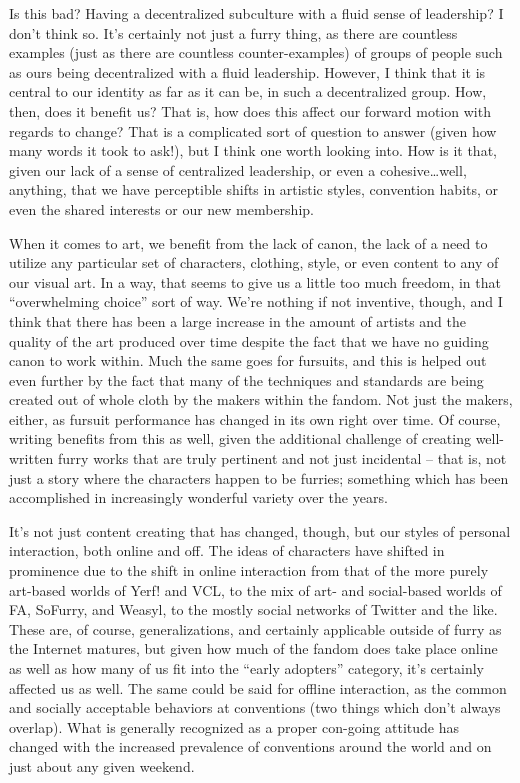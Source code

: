 Is this bad? Having a decentralized subculture with a fluid sense of leadership? I don’t think so. It’s certainly not just a furry thing, as there are countless examples (just as there are countless counter-examples) of groups of people such as ours being decentralized with a fluid leadership. However, I think that it is central to our identity as far as it can be, in such a decentralized group. How, then, does it benefit us? That is, how does this affect our forward motion with regards to change? That is a complicated sort of question to answer (given how many words it took to ask!), but I think one worth looking into. How is it that, given our lack of a sense of centralized leadership, or even a cohesive\ldots well, anything, that we have perceptible shifts in artistic styles, convention habits, or even the shared interests or our new membership.

When it comes to art, we benefit from the lack of canon, the lack of a need to utilize any particular set of characters, clothing, style, or even content to any of our visual art. In a way, that seems to give us a little too much freedom, in that ``overwhelming choice'' sort of way. We’re nothing if not inventive, though, and I think that there has been a large increase in the amount of artists and the quality of the art produced over time despite the fact that we have no guiding canon to work within. Much the same goes for fursuits, and this is helped out even further by the fact that many of the techniques and standards are being created out of whole cloth by the makers within the fandom. Not just the makers, either, as fursuit performance has changed in its own right over time. Of course, writing benefits from this as well, given the additional challenge of creating well-written furry works that are truly pertinent and not just incidental -- that is, not just a story where the characters happen to be furries; something which has been accomplished in increasingly wonderful variety over the years.

It’s not just content creating that has changed, though, but our styles of personal interaction, both online and off. The ideas of characters have shifted in prominence due to the shift in online interaction from that of the more purely art-based worlds of Yerf! and VCL, to the mix of art- and social-based worlds of FA, SoFurry, and Weasyl, to the mostly social networks of Twitter and the like. These are, of course, generalizations, and certainly applicable outside of furry as the Internet matures, but given how much of the fandom does take place online as well as how many of us fit into the ``early adopters'' category, it’s certainly affected us as well. The same could be said for offline interaction, as the common and socially acceptable behaviors at conventions (two things which don’t always overlap). What is generally recognized as a proper con-going attitude has changed with the increased prevalence of conventions around the world and on just about any given weekend.

